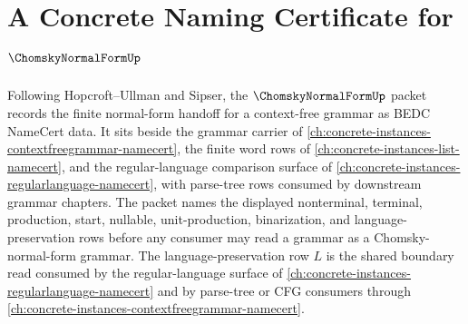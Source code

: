 \chapter{A Concrete Naming Certificate for $\ChomskyNormalFormUp$}
\label{ch:concrete-instances-chomsky-normal-form-namecert}

Following Hopcroft--Ullman and Sipser, the $\ChomskyNormalFormUp$ packet records the finite normal-form handoff for a context-free grammar as BEDC NameCert data. It sits beside the grammar carrier of \autoref{ch:concrete-instances-contextfreegrammar-namecert}, the finite word rows of \autoref{ch:concrete-instances-list-namecert}, and the regular-language comparison surface of \autoref{ch:concrete-instances-regularlanguage-namecert}, with parse-tree rows consumed by downstream grammar chapters. The packet names the displayed nonterminal, terminal, production, start, nullable, unit-production, binarization, and language-preservation rows before any consumer may read a grammar as a Chomsky-normal-form grammar.
The language-preservation row $L$ is the shared boundary read consumed by the regular-language surface of \autoref{ch:concrete-instances-regularlanguage-namecert} and by parse-tree or CFG consumers through \autoref{ch:concrete-instances-contextfreegrammar-namecert}.

